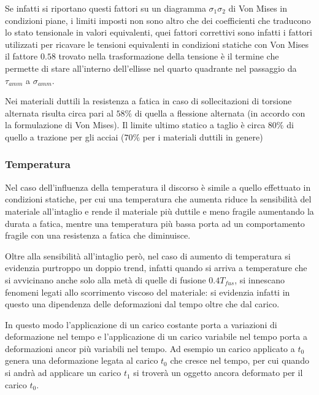 			 Se infatti si riportano questi fattori su un diagramma $ \sigma_1\sigma_2 $ di Von Mises in condizioni piane, i limiti imposti non sono altro che dei coefficienti che traducono lo stato tensionale in valori equivalenti, quei fattori correttivi sono infatti i fattori utilizzati per ricavare le tensioni equivalenti in condizioni statiche con Von Mises il fattore $ 0.58 $ trovato nella trasformazione della tensione è il termine che permette di stare all'interno dell'ellisse nel quarto quadrante nel passaggio da $\tau_{amm}$ a $\sigma_{amm}$. \newline 
			 
			 Nei materiali duttili la resistenza a fatica in caso di sollecitazioni di torsione alternata risulta circa pari al $ 58\% $ di
			 quella a flessione alternata (in accordo con la formulazione di Von Mises).
			 Il
			 limite ultimo statico a taglio è circa $ 80\% $ di quello a trazione per gli acciai ($ 70\% $ per i materiali duttili in genere)

			 			 
\subsubsection{Temperatura}
			 Nel caso dell'influenza della temperatura il discorso è simile a quello effettuato in condizioni statiche, per cui una temperatura che aumenta riduce la sensibilità del materiale all'intaglio e rende il materiale più duttile e meno fragile aumentando la durata a fatica, mentre una temperatura più bassa porta ad un comportamento fragile con una resistenza a fatica che diminuisce. 
			 
			 Oltre alla sensibilità all'intaglio però, nel caso di aumento di temperatura si evidenzia purtroppo un doppio trend, infatti quando si arriva a temperature che si avvicinano anche solo alla metà di quelle di fusione $0.4T_{fus}$, si innescano fenomeni legati allo scorrimento viscoso del materiale: si evidenzia infatti in questo una dipendenza delle deformazioni dal tempo oltre che dal carico. 
			 
			 In questo modo l'applicazione di un carico costante porta a variazioni di deformazione nel tempo e l'applicazione di un carico variabile nel tempo porta a deformazioni ancor più variabili nel tempo. Ad esempio un carico applicato a $t_0$ genera una deformazione legata al carico $t_0$ che cresce nel tempo, per cui quando si andrà ad applicare un carico $t_1$ si troverà un oggetto ancora deformato per il carico $t_0$. \newline
			 
